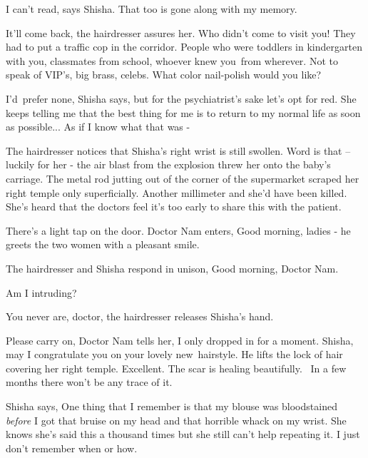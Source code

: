 \documentclass[letterpaper]{article}
\begin{document}
{\textquotedbl}I can't read,{\textquotedbl} says Shisha. {\textquotedbl}That too is gone along with my
memory.{\textquotedbl} 

{\textquotedbl}It'll come back,{\textquotedbl} the hairdresser assures her. {\textquotedbl}Who didn't come to visit you!
They had to put a traffic cop in the corridor. People who were toddlers in kindergarten with you, classmates from
school, whoever knew you\ from wherever. Not to speak of VIP's, big brass, celebs. What color nail-polish would you
like? {\textquotedbl} 

{\textquotedbl}I'd\textcolor[rgb]{0.0,0.4392157,0.7529412}{\ }prefer none,{\textquotedbl} Shisha says,
{\textquotedbl}but for the psychiatrist's sake let's opt for red. She keeps telling me that the best thing for me is to
return to my normal life as soon as possible... As if I know what that was -{\textquotedbl} ~

The hairdresser notices that Shisha's right wrist is still swollen. Word is that -- luckily for her - the air blast from
the explosion threw her onto the baby's carriage. The metal rod jutting out of the corner of the supermarket scraped
her right temple only superficially. Another millimeter and she'd have been killed. She's heard that the doctors feel
it's too early to share this with the patient.

There's a light tap on the door. Doctor Nam enters, {\textquotedbl}Good morning, ladies -{\textquotedbl} he greets the
two women with a pleasant smile.

The hairdresser and Shisha respond in unison, {\textquotedbl}Good morning, Doctor Nam.{\textquotedbl} 

{\textquotedbl}Am I intruding?{\textquotedbl} 

{\textquotedbl}You never are, doctor,{\textquotedbl} the hairdresser releases Shisha's hand. 

{\textquotedbl}Please carry on,{\textquotedbl} Doctor Nam tells her, {\textquotedbl}I only dropped in for a moment.
Shisha, may I congratulate you on your lovely new~hairstyle.{\textquotedbl} He lifts the lock of hair covering her
right temple. {\textquotedbl}Excellent. The scar is healing beautifully. ~In a few months there won't be any trace of
it.{\textquotedbl} 

Shisha says, {\textquotedbl}One thing that I remember is that my blouse was bloodstained \textit{before} I got that
bruise on my head and that horrible whack on my wrist.{\textquotedbl} She knows she's said this a thousand times but
she still can't help repeating it. {\textquotedbl}I just don't remember when or how.{\textquotedbl} 
\end{document}
